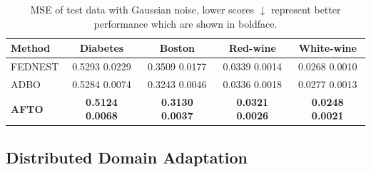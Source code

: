 \documentclass[letterpaper]{article}
\begin{document}
\renewcommand\arraystretch{1}
\renewcommand\tabcolsep{10pt}
\begin{table}
\centering
\renewcommand{\thetable}{\arabic{table}}
{
\begin{adjustbox}{width=0.86\columnwidth}
\begin{tabular}{l|c|c|c|c}
\toprule
Method   & Diabetes   & Boston  & Red-wine & White-wine   \\ \hline
FEDNEST  &  0.5293  0.0229 & 0.3509  0.0177 &  0.0339  0.0014  & 0.0268  0.0010  \\
ADBO  &  0.5284  0.0074 & 0.3243  0.0046 & 0.0336  0.0018 & 0.0277  0.0013  \\ \hline
\textbf{AFTO} & \textbf{0.5124}  \textbf{0.0068}  & \textbf{0.3130}  \textbf{0.0037} & \textbf{0.0321}  \textbf{0.0026} & \textbf{0.0248}  \textbf{0.0021} \\

\bottomrule
\end{tabular}
\end{adjustbox}}
\caption{MSE of test data with Gaussian noise, lower scores $\downarrow$ represent better performance which are shown in boldface.}
\label{tab:ADBO-ATOP}
\end{table}



\subsection{Distributed Domain Adaptation}
\end{document}
